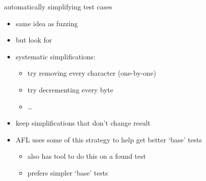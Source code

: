 
\begin{frame}[fragile,label=covMin]{automatically simplifying test cases}
    \begin{itemize}
        \item same idea as fuzzing
        \item but look for 
        \item systematic simplifications:
            \begin{itemize}
                \item try removing every character (one-by-one)
                \item try decrementing every byte
                \item \ldots
            \end{itemize}
        \item keep simplifications that don't change result
        \item AFL uses some of this strategy to help get better `base' tests
            \begin{itemize}
            \item also has tool to do this on a found test
            \item prefers simpler `base' tests
            \end{itemize}
    \end{itemize}
\end{frame}
